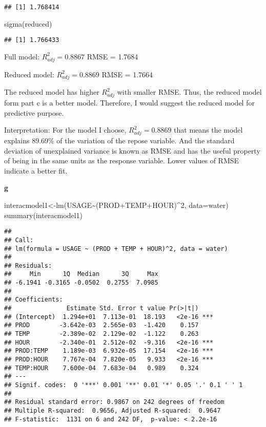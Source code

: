 \documentclass[
]{article}
\newenvironment{Shaded}{\begin{snugshade}}{\end{snugshade}}
\newcommand{\AttributeTok}[1]{\textcolor[rgb]{0.77,0.63,0.00}{#1}}
\newcommand{\DecValTok}[1]{\textcolor[rgb]{0.00,0.00,0.81}{#1}}
\newcommand{\FunctionTok}[1]{\textcolor[rgb]{0.00,0.00,0.00}{#1}}
\newcommand{\NormalTok}[1]{#1}
\newcommand{\OtherTok}[1]{\textcolor[rgb]{0.56,0.35,0.01}{#1}}
\newcommand{\SpecialCharTok}[1]{\textcolor[rgb]{0.00,0.00,0.00}{#1}}
\begin{document}
\begin{verbatim}
## [1] 1.768414
\end{verbatim}

\begin{Shaded}
\begin{Highlighting}[]
\FunctionTok{sigma}\NormalTok{(reduced)}
\end{Highlighting}
\end{Shaded}

\begin{verbatim}
## [1] 1.766433
\end{verbatim}

Full model: \(R^2_{adj} = 0.8867\) RMSE = 1.7684

Reduced model: \(R^2_{adj} = 0.8869\) RMSE = 1.7664

The reduced model has higher \(R^2_{adj}\) with smaller RMSE. Thus, the
reduced model form part c is a better model. Therefore, I would suggest
the reduced model for predictive purpose.

Interpretation: For the model I choose, \(R^2_{adj} = 0.8869\) that
means the model explains 89.69\% of the variation of the repose
variable. And the standard deviation of unexplained variance is known as
RMSE and has the useful property of being in the same units as the
response variable. Lower values of RMSE indicate a better fit.

\textbf{g}

\begin{Shaded}
\begin{Highlighting}[]
\NormalTok{interacmodel1}\OtherTok{\textless{}{-}}\FunctionTok{lm}\NormalTok{(USAGE}\SpecialCharTok{\textasciitilde{}}\NormalTok{(PROD}\SpecialCharTok{+}\NormalTok{TEMP}\SpecialCharTok{+}\NormalTok{HOUR)}\SpecialCharTok{\^{}}\DecValTok{2}\NormalTok{, }\AttributeTok{data=}\NormalTok{water)}
\FunctionTok{summary}\NormalTok{(interacmodel1)}
\end{Highlighting}
\end{Shaded}

\begin{verbatim}
## 
## Call:
## lm(formula = USAGE ~ (PROD + TEMP + HOUR)^2, data = water)
## 
## Residuals:
##     Min      1Q  Median      3Q     Max 
## -6.1941 -0.3165 -0.0502  0.2755  7.0985 
## 
## Coefficients:
##               Estimate Std. Error t value Pr(>|t|)    
## (Intercept)  1.294e+01  7.113e-01  18.193   <2e-16 ***
## PROD        -3.642e-03  2.565e-03  -1.420    0.157    
## TEMP        -2.389e-02  2.129e-02  -1.122    0.263    
## HOUR        -2.340e-01  2.512e-02  -9.316   <2e-16 ***
## PROD:TEMP    1.189e-03  6.932e-05  17.154   <2e-16 ***
## PROD:HOUR    7.767e-04  7.820e-05   9.933   <2e-16 ***
## TEMP:HOUR    7.600e-04  7.683e-04   0.989    0.324    
## ---
## Signif. codes:  0 '***' 0.001 '**' 0.01 '*' 0.05 '.' 0.1 ' ' 1
## 
## Residual standard error: 0.9867 on 242 degrees of freedom
## Multiple R-squared:  0.9656, Adjusted R-squared:  0.9647 
## F-statistic:  1131 on 6 and 242 DF,  p-value: < 2.2e-16
\end{verbatim}
\end{document}

